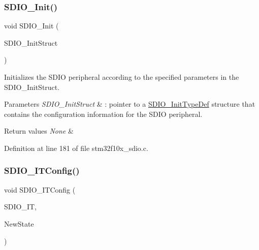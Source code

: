 \subsubsection{\texorpdfstring{S\+D\+I\+O\+\_\+\+Init()}{SDIO\_Init()}}
{\footnotesize\ttfamily void S\+D\+I\+O\+\_\+\+Init (\begin{DoxyParamCaption}\item[{\hyperlink{struct_s_d_i_o___init_type_def}{S\+D\+I\+O\+\_\+\+Init\+Type\+Def} $\ast$}]{S\+D\+I\+O\+\_\+\+Init\+Struct }\end{DoxyParamCaption})}



Initializes the S\+D\+IO peripheral according to the specified parameters in the S\+D\+I\+O\+\_\+\+Init\+Struct. 


\begin{DoxyParams}{Parameters}
{\em S\+D\+I\+O\+\_\+\+Init\+Struct} & \+: pointer to a \hyperlink{struct_s_d_i_o___init_type_def}{S\+D\+I\+O\+\_\+\+Init\+Type\+Def} structure that contains the configuration information for the S\+D\+IO peripheral. \\
\hline
\end{DoxyParams}

\begin{DoxyRetVals}{Return values}
{\em None} & \\
\hline
\end{DoxyRetVals}


Definition at line 181 of file stm32f10x\+\_\+sdio.\+c.

\mbox{\label{group___s_d_i_o___exported___functions_ga208f51237ef43288735829dbaed37f00}} 
\subsubsection{\texorpdfstring{S\+D\+I\+O\+\_\+\+I\+T\+Config()}{SDIO\_ITConfig()}}
{\footnotesize\ttfamily void S\+D\+I\+O\+\_\+\+I\+T\+Config (\begin{DoxyParamCaption}\item[{uint32\+\_\+t}]{S\+D\+I\+O\+\_\+\+IT,  }\item[{\hyperlink{group___exported__types_gac9a7e9a35d2513ec15c3b537aaa4fba1}{Functional\+State}}]{New\+State }\end{DoxyParamCaption})}



